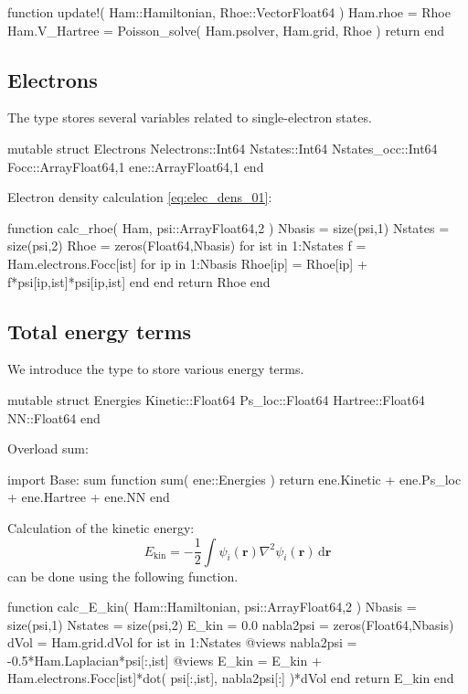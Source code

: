 \begin{juliacode}
function update!( Ham::Hamiltonian, Rhoe::Vector{Float64} )
  Ham.rhoe = Rhoe
  Ham.V_Hartree = Poisson_solve( Ham.psolver, Ham.grid, Rhoe )
  return
end
\end{juliacode}


\subsection{Electrons}

The type  stores several variables related to single-electron states.
\begin{juliacode}
mutable struct Electrons
  Nelectrons::Int64
  Nstates::Int64
  Nstates_occ::Int64
  Focc::Array{Float64,1}
  ene::Array{Float64,1}
end
\end{juliacode}

Electron density calculation \ref{eq:elec_dens_01}:

\begin{juliacode}
function calc_rhoe( Ham, psi::Array{Float64,2} )
  Nbasis = size(psi,1)
  Nstates = size(psi,2)
  Rhoe = zeros(Float64,Nbasis)
  for ist in 1:Nstates
    f = Ham.electrons.Focc[ist]
    for ip in 1:Nbasis
      Rhoe[ip] = Rhoe[ip] + f*psi[ip,ist]*psi[ip,ist]
    end
  end
  return Rhoe
end
\end{juliacode}


\subsection{Total energy terms}

We introduce the  type to store various energy terms.
\begin{juliacode}
mutable struct Energies
  Kinetic::Float64
  Ps_loc::Float64
  Hartree::Float64
  NN::Float64
end
\end{juliacode}

Overload sum:
\begin{juliacode}
import Base: sum
function sum( ene::Energies )
  return ene.Kinetic + ene.Ps_loc + ene.Hartree + ene.NN
end
\end{juliacode}

Calculation of the kinetic energy:
\begin{equation}
E_{\mathrm{kin}} =
-\frac{1}{2} \int \psi_{i}(\mathbf{r}) \nabla^{2} \psi_{i}(\mathbf{r})\,\mathrm{d}\mathbf{r}
\end{equation}
can be done using the following function.
\begin{juliacode}
function calc_E_kin( Ham::Hamiltonian, psi::Array{Float64,2} )
  Nbasis = size(psi,1)
  Nstates = size(psi,2)
  E_kin = 0.0
  nabla2psi = zeros(Float64,Nbasis)
  dVol = Ham.grid.dVol
  for ist in 1:Nstates
    @views nabla2psi = -0.5*Ham.Laplacian*psi[:,ist]
    @views E_kin = E_kin + Ham.electrons.Focc[ist]*dot( psi[:,ist], nabla2psi[:] )*dVol
  end
  return E_kin
end
\end{juliacode}

